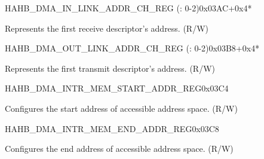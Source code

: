 \begin{register}{H}{AHB\_DMA\_IN\_LINK\_ADDR\_CH\_REG (: 0-2)}{0x03AC+0x4*}\label{regdesc:AHBDMAINLINKADDRCHNREG}
%
\regnewline%
\begin{regdesc}\begin{reglist}
\label{fielddesc:AHBDMAINLINKADDRCHN}\item [AHB\_DMA\_INLINK\_ADDR\_CH\regindex{n}] Represents the first receive descriptor's address. (R/W)
\end{reglist}\end{regdesc}
\end{register}


\begin{register}{H}{AHB\_DMA\_OUT\_LINK\_ADDR\_CH\_REG (: 0-2)}{0x03B8+0x4*}\label{regdesc:AHBDMAOUTLINKADDRCHNREG}
%
\regnewline%
\begin{regdesc}\begin{reglist}
\label{fielddesc:AHBDMAOUTLINKADDRCHN}\item [AHB\_DMA\_OUTLINK\_ADDR\_CH\regindex{n}] Represents the first transmit descriptor's address. (R/W)
\end{reglist}\end{regdesc}
\end{register}


\begin{register}{H}{AHB\_DMA\_INTR\_MEM\_START\_ADDR\_REG}{0x03C4}\label{regdesc:AHBDMAINTRMEMSTARTADDRREG}
%
\regnewline%
\begin{regdesc}\begin{reglist}
\label{fielddesc:AHBDMAACCESSINTRMEMSTARTADDR}\item [AHB\_DMA\_ACCESS\_INTR\_MEM\_START\_ADDR] Configures the start address of accessible address space. (R/W)
\end{reglist}\end{regdesc}
\end{register}


\begin{register}{H}{AHB\_DMA\_INTR\_MEM\_END\_ADDR\_REG}{0x03C8}\label{regdesc:AHBDMAINTRMEMENDADDRREG}
%
\regnewline%
\begin{regdesc}\begin{reglist}
\label{fielddesc:AHBDMAACCESSINTRMEMENDADDR}\item [AHB\_DMA\_ACCESS\_INTR\_MEM\_END\_ADDR] Configures the end address of accessible address space. (R/W)
\end{reglist}\end{regdesc}
\end{register}


